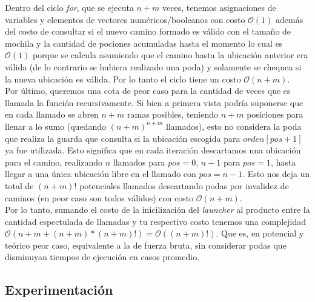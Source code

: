     Dentro del ciclo \emph{for}, que se ejecuta $n+m$ veces, tenemos asignaciones de variables y elementos de vectores numéricos/booleanos con costo $\mathcal{O}(1)$ además del costo de consultar si el nuevo camino formado es válido con el tamaño de mochila y la cantidad de pociones acumuladas hasta el momento lo cual es $\mathcal{O}(1)$ porque se calcula asumiendo que el camino hasta la ubicación anterior era válida (de lo contrario se hubiera realizado una poda) y solamente se chequea si la nueva ubicación es válida. Por lo tanto el ciclo tiene un costo $\mathcal{O}(n+m)$.
    \\

    Por último, queremos una cota de peor caso para la cantidad de veces que es llamada la función recursivamente. Si bien a primera vista podría suponerse que en cada llamado se abren $n+m$ ramas posibles, teniendo $n+m$ posiciones para llenar a lo sumo (quedando $(n+m)^{n+m}$ llamados), esto no considera la poda que realiza la guarda que consulta si la ubicación escogida para $orden[pos+1]$ ya fue utilizada. Esto significa que en cada iteración descartamos una ubicación para el camino, realizando $n$ llamados para $pos=0$, $n-1$ para $pos=1$, hasta llegar a una única ubicación libre en el llamado con $pos=n-1$. Esto nos deja un total de $(n+m)!$ potenciales llamados descartando podas por invalidez de caminos (en peor caso son todos válidos) con costo $\mathcal{O}(n+m)$.
    \\

    Por lo tanto, sumando el costo de la inicilización del \emph{launcher} al producto entre la cantidad espectulada de llamadas y tu respectivo costo tenemos una complejidad $\mathcal{O}(n+m + (n+m)*(n+m)!) = \mathcal{O}((n+m)!)$. Que es, en potencial y teórico peor caso, equivalente a la de fuerza bruta, sin considerar podas que disminuyan tiempos de ejecución en casos promedio.

    \subsection{Experimentación}
